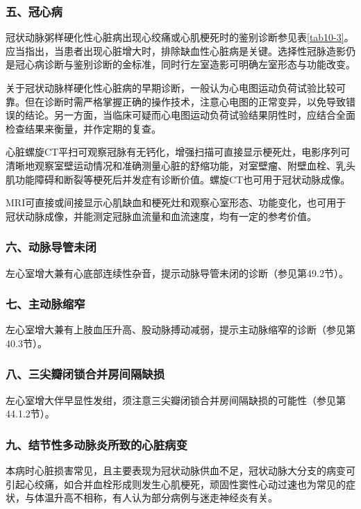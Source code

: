 \subsubsection{五、冠心病}

冠状动脉粥样硬化性心脏病出现心绞痛或心肌梗死时的鉴别诊断参见表\ref{tab10-3}。应当指出，当患者出现心脏增大时，排除缺血性心脏病是关键。选择性冠脉造影仍是冠心病诊断与鉴别诊断的金标准，同时行左室造影可明确左室形态与功能改变。

关于冠状动脉样硬化性心脏病的早期诊断，一般认为心电图运动负荷试验比较可靠。但在诊断时需严格掌握正确的操作技术，注意心电图的正常变异，以免导致错误的结论。另一方面，当临床可疑而心电图运动负荷试验结果阴性时，应结合全面检查结果来衡量，并作定期的复查。

心脏螺旋CT平扫可观察冠脉有无钙化，增强扫描可直接显示梗死灶，电影序列可清晰地观察室壁运动情况和准确测量心脏的舒缩功能，对室壁瘤、附壁血栓、乳头肌功能障碍和断裂等梗死后并发症有诊断价值。螺旋CT也可用于冠状动脉成像。

MRI可直接或间接显示心肌缺血和梗死灶和观察心室形态、功能变化，也可用于冠状动脉成像，并能测定冠脉血流量和血流速度，均有一定的参考价值。

\subsubsection{六、动脉导管未闭}

左心室增大兼有心底部连续性杂音，提示动脉导管未闭的诊断（参见第49.2节）。

\subsubsection{七、主动脉缩窄}

左心室增大兼有上肢血压升高、股动脉搏动减弱，提示主动脉缩窄的诊断（参见第40.3节）。

\subsubsection{八、三尖瓣闭锁合并房间隔缺损}

左心室增大伴早显性发绀，须注意三尖瓣闭锁合并房间隔缺损的可能性（参见第44.1.2节）。

\subsubsection{九、结节性多动脉炎所致的心脏病变}

本病时心脏损害常见，且主要表现为冠状动脉供血不足，冠状动脉大分支的病变可引起心绞痛，如合并血栓形成则发生心肌梗死，顽固性窦性心动过速也为常见的症状，与体温升高不相称，有人认为部分病例与迷走神经炎有关。

